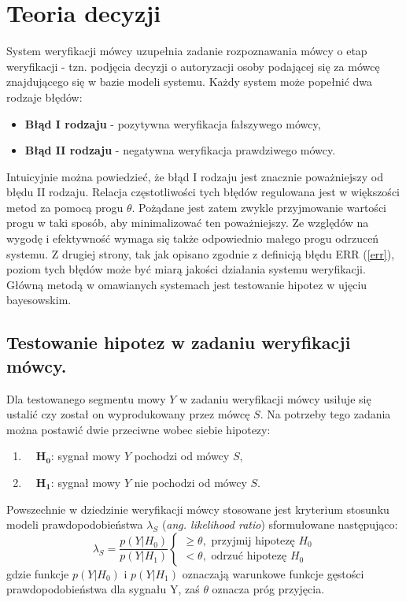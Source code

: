 \section{Teoria decyzji}
\label{verif}

System weryfikacji mówcy uzupełnia zadanie rozpoznawania mówcy o etap weryfikacji - tzn. podjęcia decyzji o autoryzacji osoby podającej się za mówcę znajdującego się w bazie modeli systemu. Każdy system może popełnić dwa rodzaje błędów:
\begin{itemize}
  \item{\textbf{Błąd I rodzaju}} - pozytywna weryfikacja fałszywego mówcy,
  \item{\textbf{Błąd II rodzaju}} - negatywna weryfikacja prawdziwego mówcy.
\end{itemize}
Intuicyjnie można powiedzieć, że błąd I rodzaju jest znacznie poważniejszy od błędu II rodzaju. Relacja częstotliwości tych błędów regulowana jest w większości metod za pomocą progu $\theta$. Pożądane jest zatem zwykle przyjmowanie wartości progu w taki sposób, aby minimalizować ten poważniejszy. Ze względów na wygodę i efektywność wymaga się także odpowiednio małego progu odrzuceń systemu. Z drugiej strony, tak jak opisano zgodnie z definicją błędu ERR (\ref{err}), poziom tych błędów
może być miarą jakości działania systemu weryfikacji. Główną metodą w omawianych systemach jest testowanie hipotez w ujęciu bayesowskim.  

\subsection{Testowanie hipotez w zadaniu weryfikacji mówcy.}

Dla testowanego segmentu mowy $Y$ w zadaniu weryfikacji mówcy usiłuje się ustalić czy został on wyprodukowany przez mówcę $S$. Na potrzeby tego zadania można postawić dwie przeciwne wobec siebie hipotezy:
\begin{enumerate}
  \item{$\quad\bm{H_0}$}: sygnał mowy $Y$ pochodzi od mówcy $S$,
  \item{$\quad\bm{H_1}$}: sygnał mowy $Y$ nie pochodzi od mówcy $S$.
\end{enumerate}
Powszechnie w dziedzinie weryfikacji mówcy stosowane jest kryterium stosunku modeli prawdopodobieństwa $\lambda_S$ (\textit{ang. likelihood ratio}) sformułowane następująco:
\begin{equation}
  \label{likratio}
  \lambda_S = \frac{p(Y|H_0)}{p(Y|H_1)}
  \begin{cases}
    \ge \theta, \textrm{ przyjmij hipotezę } H_0 \\
    < \theta, \textrm{ odrzuć hipotezę } H_0
  \end{cases}
\end{equation}
gdzie funkcje $p(Y|H_0)$ i $p(Y|H_1)$ oznaczają warunkowe funkcje gęstości prawdopodobieństwa dla sygnału Y, zaś $\theta$ oznacza próg przyjęcia. 

